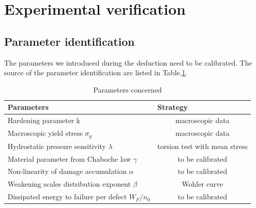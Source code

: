 \documentclass[3p,times,number,review]{elsarticle}
\begin{document}
\newpage
\section{Experimental verification}
\subsection{Parameter identification}
The parameters we introduced during the deduction need to be calibrated. The source of the parameter identification are listed in Table.\ref{paras}.
\begin{table}[!h]
	\centering
	\begin{tabular}{l|c}
		\hline
		\textbf{Parameters}                                  & \multicolumn{1}{l}{\textbf{Strategy}} \\ \hline
		Hardening parameter k                                & macroscopic data                      \\
		Macroscopic yield stress $\sigma_y$                  & macroscopic data                      \\
		Hydrostatic pressure sensitivity $\lambda$           & torsion test with mean stress         \\
		Material parameter from Chaboche law   $\gamma$      & to be calibrated                      \\
		Non-linearity of damage accumulation  $\alpha$       & to be calibrated                      \\
		Weakening scales distribution exponent  $\beta$      & Wohler curve                          \\
		Dissipated energy to failure per defect  $W_F$/$n_0$ & to be calibrated                      \\ \hline
	\end{tabular}
	\caption{Parameters concerned}
\label{paras}
\end{table}
\end{document}
